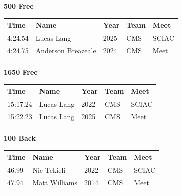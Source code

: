 \vspace{1.2em}
\noindent\begin{minipage}[t]{0.98\textwidth}
\centering
\textbf{\textcolor{teamprimary}{500 Free}}\par
\vspace{0.5em}
\centering
\small
\renewcommand{\arraystretch}{1.0}
\setlength{\tabcolsep}{4pt}
\begin{tabular}{@{}p{2.5cm}p{4.5cm}p{1.5cm}p{2.5cm}p{2.5cm}@{}}
\toprule
\textbf{Time} & \textbf{Name} & \textbf{Year} & \textbf{Team} & \textbf{Meet} \\
\midrule
4:24.54 & Lucas Lang & 2025 & CMS & SCIAC \\
4:24.75 & Anderson Breazeale & 2024 & CMS & Meet \\
\bottomrule
\vspace{0.5em}
\end{tabular}
\end{minipage}
\vspace{1.2em}
\noindent\begin{minipage}[t]{0.98\textwidth}
\centering
\textbf{\textcolor{teamprimary}{1650 Free}}\par
\vspace{0.5em}
\centering
\small
\renewcommand{\arraystretch}{1.0}
\setlength{\tabcolsep}{4pt}
\begin{tabular}{@{}p{2.5cm}p{4.5cm}p{1.5cm}p{2.5cm}p{2.5cm}@{}}
\toprule
\textbf{Time} & \textbf{Name} & \textbf{Year} & \textbf{Team} & \textbf{Meet} \\
\midrule
15:17.24 & Lucas Lang & 2022 & CMS & SCIAC \\
15:22.23 & Lucas Lang & 2025 & CMS & Meet \\
\bottomrule
\vspace{0.5em}
\end{tabular}
\end{minipage}
\vspace{1.2em}
\noindent\begin{minipage}[t]{0.98\textwidth}
\centering
\textbf{\textcolor{teamprimary}{100 Back}}\par
\vspace{0.5em}
\centering
\small
\renewcommand{\arraystretch}{1.0}
\setlength{\tabcolsep}{4pt}
\begin{tabular}{@{}p{2.5cm}p{4.5cm}p{1.5cm}p{2.5cm}p{2.5cm}@{}}
\toprule
\textbf{Time} & \textbf{Name} & \textbf{Year} & \textbf{Team} & \textbf{Meet} \\
\midrule
46.99 & Nic Tekieli & 2022 & CMS & SCIAC \\
47.94 & Matt Williams & 2014 & CMS & Meet \\
\bottomrule
\vspace{0.5em}
\end{tabular}
\end{minipage}
